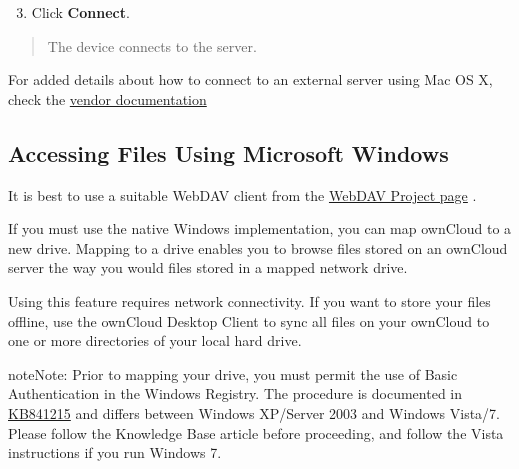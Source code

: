 \documentclass[letterpaper,10pt,english]{sphinxmanual}
\begin{document}
\begin{enumerate}
\setcounter{enumi}{2}
\item {} 
Click \textbf{Connect}.

\end{enumerate}
\begin{quote}

The device connects to the server.
\end{quote}

For added details about how to connect to an external server using Mac OS X,
check the \href{http://docs.info.apple.com/article.html?path=Mac/10.6/en/8160.html}{vendor documentation}


\subsection{Accessing Files Using Microsoft Windows}
\label{files/access_webdav:accessing-files-using-microsoft-windows}
It is best to use a suitable WebDAV client from the
\href{http://www.webdav.org/projects/}{WebDAV Project page} .

If you must use the native Windows implementation, you can map ownCloud to a new
drive. Mapping to a drive enables you to browse files stored on an ownCloud
server the way you would files stored in a mapped network drive.

Using this feature requires network connectivity. If you want to store your
files offline, use the ownCloud Desktop Client to sync all files on your
ownCloud to one or more directories of your local hard drive.

\begin{notice}{note}{Note:}
Prior to mapping your drive, you must permit the use of Basic
Authentication in the Windows Registry. The procedure is documented in
\href{http://support.microsoft.com/kb/841215}{KB841215} and differs between Windows XP/Server 2003 and Windows Vista/7.
Please follow the Knowledge Base article before proceeding, and follow the
Vista instructions if you run Windows 7.
\end{notice}
\end{document}
